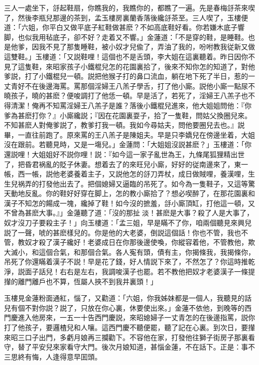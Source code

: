 三人一處坐下，㧱起鞋扇，你瞧我的，我瞧你的，都瞧了一遍。先是春梅㧱茶來喫了，然後李瓶兒那邊的茶到，孟玉樓房裏蘭香落後纔㧱茶至。三人喫了，玉樓便道：「六姐，你平白又做平底子紅鞋做甚麽？不如高底鞋好看。你若嫌木底子響脚，也似我用毡底子，卻不好？走着又不響。」金蓮道：「不是穿的鞋，是睡鞋。也是他爹，因我不見了那隻睡鞋，被小奴才兒偸了，弄油了我的，吩咐教我従新又做這雙鞋。」玉樓道：「又説鞋哩！這個也不是舌頭，李大姐在這裏聽着。昨日因你不見了這隻鞋，來昭家孩子小鐵棍兒怎的花園裏拾了，後來不知你怎的知道了，對他爹説，打了小鐵棍兒一頓。説把他猴子打的鼻口流血，躺在地下死了半日，惹的一丈青好不在後邊海罵。罵那個淫婦王八羔子學舌，打了他小廝。説他小廝一點尿不曉孩子，曉的甚麽？便唆調打了他恁一頓。早是活了，若死了，淫婦王八羔子也不得清潔！俺再不知罵淫婦王八羔子是誰？落後小鐵棍兒進來，他大姐姐問他：『你爹為甚麽打你？』小廝纔説；『因在花園裏耍子，拾了一隻鞋，問姑父換圈兒來。不知甚麽人對俺爹説了，教爹打我一頓。我如今尋姑夫，問他要圈兒去也。』説畢，一直往前跑了。原來罵的王八羔子是陳姐夫。早是只李嬌兒在傍邊坐着，大姐沒在跟前。若聽見時，又是一塲兒。」金蓮問：「大姐姐沒説甚麽？」玉樓道：「你還説哩！大姐姐好不説你哩！説：『如今這一家子亂世為王，九條尾狐狸精出世了，把昏君祸亂的貶子休妻。想着去了的來旺兒小廝，好好的従南邊來了，東一帳，西一帳，説他老婆養着主子，又説他怎的㧱刀弄杖，成日做賊哩，養漢哩，生生兒祸弄的打發他出去了。把個媳婦又逼臨的吊死了。如今為一隻鞋子，又這等驚天動地反亂。你的鞋好好穿在脚上，怎的教小廝拾了？想必喫醉了，在那花園裏和漢子不知怎的餳成一塊，纔掉了鞋！如今沒的摭羞，㧱小廝頂缸，打他這一頓，又不曾為甚麽大事。』」金蓮聽了道：「沒的那扯𣭈淡！甚麽是大事？殺了人是大事了，奴才沒刀子要殺主子！」向玉樓道：「孟三姐，早是瞞不了你，咱兩個聽見來興兒説了一聲，唬的甚麽樣兒的。你是他的大老婆，倒説這個話！你也不管，我也不管，教奴才殺了漢子纔好！老婆成日在你那後邊使喚，你縱容着他，不管教他，欺大滅小，和這個合氣，和那個合氣。各人寃有頭，債有主，你揭條我，我揭條你，吊死了你還瞞着漢子不説！早是花了錢，好人情説下來了，不然怎了？你這時推乾淨，説面子話兒！右右是左右，我調唆漢子也罷。若不教他把奴才老婆漢子一條提攆的離門離戶也不算，恆屬人挾不到我井裏頭！」

玉樓見金蓮粉面通紅，惱了，又勸道：「六姐，你我姊妹都是一個人，我聽見的話兒有個不對你説？説了，只放在你心裏，休要使出來。」金蓮不依他，到晚等的西門慶進入他房來，一五一十告西門慶説，來昭媳婦子一丈青怎的在後邊指罵，説你打了他孩子，要邏楂兒和人嚷。這西門慶不聽便罷，聽了記在心裏。到次日，要攆來昭三口子出門，多虧月娘再三攔勸下。不容他在家，打發他往獅子街房子那裏看守，替了平安兒來家看守大門。後次月娘知道，甚惱金蓮，不在話下。正是：事不三思終有悔，人逢得意早囬頭。

